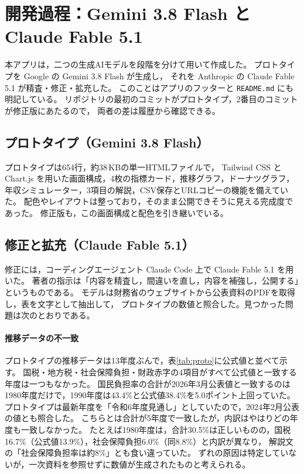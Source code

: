 \documentclass[paper=a4,fontsize=10pt]{jlreq}
\newcommand{\code}[1]{\texttt{#1}}
\begin{document}
\section{開発過程：Gemini 3.8 Flash と Claude Fable 5.1}\label{sec:ai}

本アプリは，二つの生成AIモデルを段階を分けて用いて作成した。
プロトタイプを Google の Gemini 3.8 Flash が生成し，
それを Anthropic の Claude Fable 5.1 が精査・修正・拡充した。
このことはアプリのフッターと \code{README.md} にも明記している。
リポジトリの最初のコミットがプロトタイプ，2番目のコミットが修正版にあたるので，
両者の差は履歴から確認できる。

\subsection{プロトタイプ（Gemini 3.8 Flash）}

プロトタイプは654行，約38\,KBの単一HTMLファイルで，
Tailwind CSS と Chart.js を用いた画面構成，4枚の指標カード，推移グラフ，ドーナツグラフ，
年収シミュレーター，3項目の解説，CSV保存とURLコピーの機能を備えていた。
配色やレイアウトは整っており，そのまま公開できそうに見える完成度であった。
修正版も，この画面構成と配色を引き継いでいる。

\subsection{修正と拡充（Claude Fable 5.1）}

修正には，コーディングエージェント Claude Code 上で Claude Fable 5.1 を用いた。
著者の指示は「内容を精査し，間違いを直し，内容を補強し，公開する」というものである。
モデルは財務省のウェブサイトから公表資料のPDFを取得し，表を文字として抽出して，
プロトタイプの数値と照合した。見つかった問題は次のとおりである。

\paragraph{推移データの不一致}
プロトタイプの推移データは13年度ぶんで，表\ref{tab:proto}に公式値と並べて示す。
国税・地方税・社会保障負担・財政赤字の4項目がすべて公式値と一致する年度は一つもなかった。
国民負担率の合計が2026年3月公表値と一致するのは1980年度だけで，1990年度は43.4\%と公式値38.4\%を5.0ポイント上回っていた。
プロトタイプは最新年度を「令和6年度見通し」としていたので，2024年2月公表の値\cite{mof2024}とも照合した。
こちらとは合計が5年度で一致したが，内訳はやはりどの年度も一致しなかった。
たとえば1980年度は，合計30.5\%は正しいものの，国税16.7\%（公式値13.9\%），社会保障負担6.0\%（同8.8\%）と内訳が異なり，
解説文の「社会保障負担率は約8\%」とも食い違っていた。
ずれの原因は特定していないが，一次資料を参照せずに数値が生成されたものと考えられる。
\end{document}
